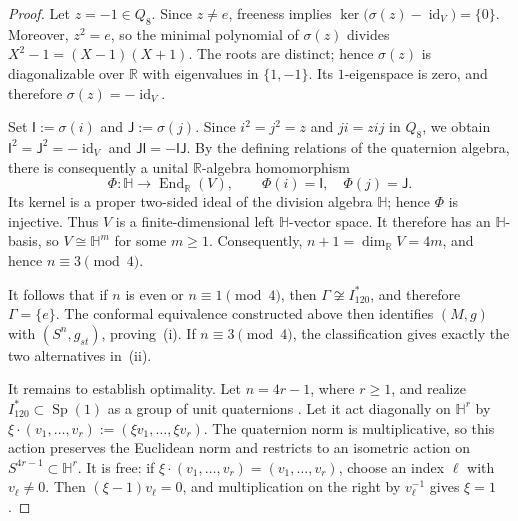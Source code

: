 \documentclass[12pt,oneside,a4paper]{article}
\theoremstyle{mytheorem}
\theoremstyle{remark}
\theoremstyle{definition}
\begin{document}
\begin{proof}
Let \(z=-1\in Q_8\). Since \(z\ne e\), freeness implies
\(\ker\bigl(\sigma(z)-\operatorname{id}_V\bigr)=\{0\}\).
Moreover, \(z^2=e\), so the minimal polynomial of \(\sigma(z)\) divides
\(X^2-1=(X-1)(X+1)\).
The roots are distinct; hence \(\sigma(z)\) is diagonalizable over
\(\mathbb R\) with eigenvalues in \(\{1,-1\}\). Its \(1\)-eigenspace is zero,
and therefore \(\sigma(z)=-\operatorname{id}_V\).

Set \(\mathsf I:=\sigma(i)\) and \(\mathsf J:=\sigma(j)\). Since
\(i^2=j^2=z\) and \(ji=zij\) in \(Q_8\), we obtain
\(\mathsf I^2=\mathsf J^2=-\operatorname{id}_V\) and
\(\mathsf J\mathsf I=-\mathsf I\mathsf J\).
By the defining relations of the quaternion algebra, there is consequently
a unital \(\mathbb R\)-algebra homomorphism
\[
\Phi\colon\mathbb H\longrightarrow\operatorname{End}_{\mathbb R}(V),
\qquad
\Phi(i)=\mathsf I,\quad
\Phi(j)=\mathsf J.
\]
Its kernel is a proper two-sided ideal of the division algebra \(\mathbb H\);
hence \(\Phi\) is injective. Thus \(V\) is a finite-dimensional left
\(\mathbb H\)-vector space. It therefore has an \(\mathbb H\)-basis, so
\(V\cong\mathbb H^m\) for some \(m\geq1\). Consequently,
\(n+1=\dim_{\mathbb R}V=4m\), and hence \(n\equiv3\pmod4\).

It follows that if \(n\) is even or \(n\equiv1\pmod4\), then
\(\Gamma\not\cong I_{120}^*\), and therefore \(\Gamma=\{e\}\). The conformal
equivalence constructed above then identifies \((M,g)\) with
\((S^n,g_{st})\), proving~(i). If \(n\equiv3\pmod4\), the classification
gives exactly the two alternatives in~(ii).

It remains to establish optimality. Let \(n=4r-1\), where \(r\geq1\), and
realize \(I_{120}^*\subset\operatorname{Sp}(1)\) as a group of unit
quaternions \cite[p.~5563]{zbMATH06871580}. Let it act diagonally on
\(\mathbb H^r\) by
\(\xi\cdot(v_1,\ldots,v_r):=(\xi v_1,\ldots,\xi v_r)\).
The quaternion norm is multiplicative, so this action preserves the Euclidean
norm and restricts to an isometric action on
\(S^{4r-1}\subset\mathbb H^r\). It is free: if
\(\xi\cdot(v_1,\ldots,v_r)=(v_1,\ldots,v_r)\), choose an index \(\ell\) with
\(v_\ell\ne0\). Then \((\xi-1)v_\ell=0\), and multiplication on the right by
\(v_\ell^{-1}\) gives \(\xi=1\).


\end{proof}
\end{document}
